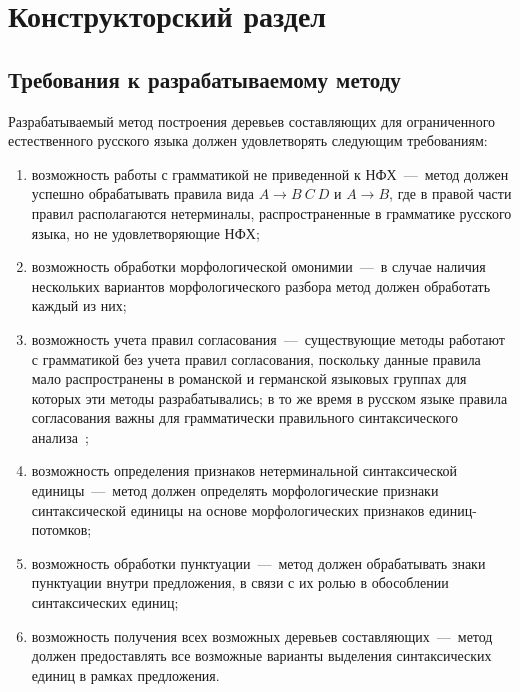 \chapter{Конструкторский раздел}

\section{Требования к разрабатываемому методу}

Разрабатываемый метод построения деревьев составляющих для ограниченного естественного русского языка должен удовлетворять следующим требованиям:
\begin{enumerate}
	\item возможность работы с грамматикой не приведенной к НФХ~---~метод должен успешно обрабатывать правила вида $A \rightarrow B\ C\ D$ и $A \rightarrow B$, где в правой части правил располагаются нетерминалы, распространенные в грамматике русского языка, но не удовлетворяющие НФХ;
	\item возможность обработки морфологической омонимии~---~в случае наличия нескольких вариантов морфологического разбора метод должен обработать каждый из них;
	\item возможность учета правил согласования~---~существующие методы работают с грамматикой без учета правил согласования, поскольку данные правила мало распространены в романской и германской языковых группах для которых эти методы разрабатывались; в то же время в русском языке правила согласования важны для грамматически правильного синтаксического анализа~\cite{Arakin_2010,Gak_1983};
	\item возможность определения признаков нетерминальной синтаксической единицы~---~метод должен определять морфологические признаки синтаксической единицы на основе морфологических признаков единиц-потомков;
	\item  возможность обработки пунктуации~---~метод должен обрабатывать знаки пунктуации внутри предложения, в связи с их ролью в обособлении синтаксических единиц;
	\item возможность получения всех возможных деревьев составляющих~---~метод должен предоставлять все возможные варианты выделения синтаксических единиц в рамках предложения.
\end{enumerate}

